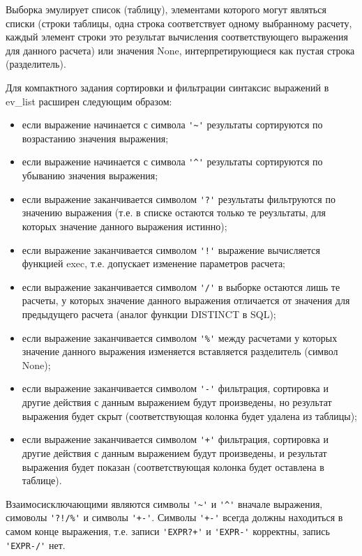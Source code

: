 Выборка эмулирует список (таблицу), элементами которого могут являться списки
(строки таблицы, одна строка соответствует одному выбранному расчету, каждый
элемент строки это результат вычисления соответствующего выражения для данного
расчета) или значения {\sf None}, интерпретирующиеся как пустая строка (разделитель).


Для компактного задания сортировки и фильтрации синтаксис выражений в {\sf ev\_list} расширен
следующим образом:
\begin{itemize}
\item если выражение начинается с символа \verb|'~'| результаты сортируются
  по возрастанию значения выражения;
\item если выражение начинается с символа \verb|'^'| результаты сортируются
  по убыванию значения выражения;
\item если выражение заканчивается символом \verb|'?'| результаты фильтруются
  по значению выражения (т.е. в списке остаются только те реузльтаты, для
  которых значение данного выражения истинно);
\item если выражение заканчивается символом \verb|'!'| выражение вычисляется
  функцией {\sf exec}, т.е. допускает изменение параметров расчета;
\item если выражение заканчивается символом \verb|'/'|   в выборке остаются
  лишь те расчеты, у которых значение данного выражения отличается от значения
  для предыдущего расчета (аналог функции {\sf DISTINCT} в {\sf SQL});
\item если выражение заканчивается символом \verb|'%'| между расчетами у
  которых значение данного выражения изменяется вставляется разделитель
  (символ {\sf None});
\item если выражение заканчивается символом \verb|'-'| фильтрация, сортировка
  и другие действия с данным выражением будут произведены, но результат
  выражения будет скрыт (соответствующая колонка будет удалена из таблицы);
\item если выражение заканчивается символом \verb|'+'| фильтрация, сортировка
  и другие действия с данным выражением будут произведены, и результат
  выражения будет показан (соответствующая колонка будет оставлена в таблице).
\end{itemize}
Взаимосисключающими являются символы \verb|'~'| и \verb|'^'| вначале
выражения, симоволы \verb|'?!/%'| и символы \verb|'+-'|. Символы \verb|'+-'|
всегда должны находиться в самом конце выражения, т.е. записи
\verb|'EXPR?+'| и \verb|'EXPR-'| корректны, запись \verb|'EXPR-/'| нет. 

